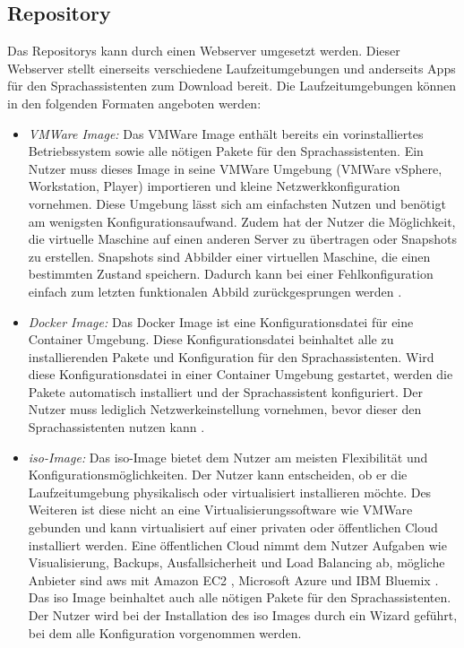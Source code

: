 \subsection{Repository}
Das Repositorys kann durch einen Webserver umgesetzt werden. Dieser Webserver stellt einerseits verschiedene Laufzeitumgebungen und anderseits Apps für den Sprachassistenten zum Download bereit. Die Laufzeitumgebungen können in den folgenden Formaten angeboten werden:
\begin{itemize}
	\item \textsl{VMWare Image:} Das VMWare Image enthält bereits ein vorinstalliertes Betriebssystem sowie alle nötigen Pakete für den Sprachassistenten. Ein Nutzer muss dieses Image in seine VMWare Umgebung (VMWare vSphere, Workstation, Player) importieren und kleine Netzwerkkonfiguration vornehmen. Diese Umgebung lässt sich am einfachsten Nutzen und benötigt am wenigsten Konfigurationsaufwand. Zudem hat der Nutzer die Möglichkeit, die virtuelle Maschine auf einen anderen Server zu übertragen oder Snapshots zu erstellen. Snapshots sind Abbilder einer virtuellen Maschine, die einen bestimmten Zustand speichern. Dadurch kann bei einer Fehlkonfiguration einfach zum letzten funktionalen Abbild zurückgesprungen werden \cite{VMWare}.
	\item \textsl{Docker Image:} Das Docker Image ist eine Konfigurationsdatei für eine Container Umgebung. Diese Konfigurationsdatei beinhaltet alle zu installierenden Pakete und Konfiguration für den Sprachassistenten. Wird diese Konfigurationsdatei in einer Container Umgebung gestartet, werden die Pakete automatisch installiert und der Sprachassistent konfiguriert. Der Nutzer muss lediglich Netzwerkeinstellung vornehmen, bevor dieser den Sprachassistenten nutzen kann \cite{Docker}.
	\item \textsl{\acs{iso}-Image:} Das \acs{iso}-Image bietet dem Nutzer am meisten Flexibilität und Konfigurationsmöglichkeiten. Der Nutzer kann entscheiden, ob er die Laufzeitumgebung physikalisch oder virtualisiert installieren möchte. Des Weiteren ist diese nicht an eine Virtualisierungssoftware wie VMWare gebunden und kann virtualisiert auf einer privaten oder öffentlichen Cloud installiert werden. Eine öffentlichen Cloud nimmt dem Nutzer Aufgaben wie Visualisierung, Backups, Ausfallsicherheit und Load Balancing ab, mögliche Anbieter sind \ac{aws} mit Amazon EC2 \cite{AWSAmazonEC2}, Microsoft Azure \cite{MicrosoftAzure} und IBM Bluemix \cite{IBMBluemix}. Das \acs{iso} Image beinhaltet auch alle nötigen Pakete für den Sprachassistenten. Der Nutzer wird bei der Installation des \acs{iso} Images durch ein Wizard geführt, bei dem alle Konfiguration vorgenommen werden.
\end{itemize}

